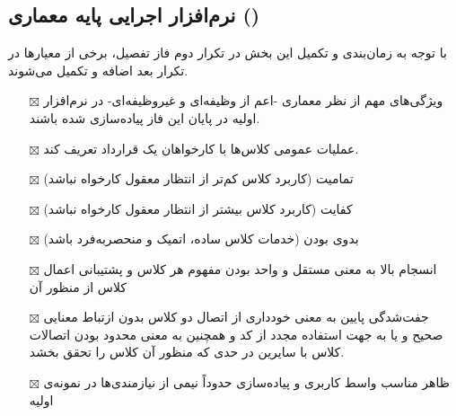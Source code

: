 \subsection{نرم‌افزار اجرایی پایه معماری ()}
با توجه به زمان‌بندی و تکمیل این بخش در تکرار دوم فاز تفصیل، برخی از معیارها در تکرار بعد اضافه و تکمیل می‌شوند.

\begin{itemize} \setlength\itemsep{0cm}
	\item[$\boxtimes$]
	ویژگی‌های مهم از نظر معماری -اعم از وظیفه‌ای و غیروظیفه‌ای- در نرم‌افزار اولیه در پایان این فاز پیاده‌سازی شده باشند.
	\item[$\boxtimes$]
	عملیات عمومی کلاس‌ها با کارخواهان یک قرارداد تعریف کند.
	\item[$\boxtimes$]
	تمامیت (کاربرد کلاس کم‌تر از انتظار معقول کارخواه نباشد)
	\item[$\boxtimes$]
	کفایت (کاربرد کلاس بیشتر از انتظار معقول کارخواه نباشد)
	\item[$\boxtimes$]
	بدوی بودن (خدمات کلاس ساده، اتمیک و منحصربه‌فرد باشد)
	\item[$\boxtimes$]
	انسجام بالا به معنی مستقل و واحد بودن مفهوم هر کلاس و پشتیبانی اعمال کلاس از منظور آن
	\item[$\boxtimes$]
	جفت‌شدگی پایین به معنی خودداری از اتصال دو کلاس بدون ازتباط معنایی صحیح و یا به جهت استفاده مجدد از کد و همچنین به معنی محدود بودن اتصالات کلاس با سایرین در حدی که منظور آن کلاس را تحقق بخشد.
	\item[$\boxtimes$]
	ظاهر مناسب واسط کاربری و پیاده‌سازی حدوداً نیمی از نیازمندی‌ها در نمونه‌ی اولیه
\end{itemize}
